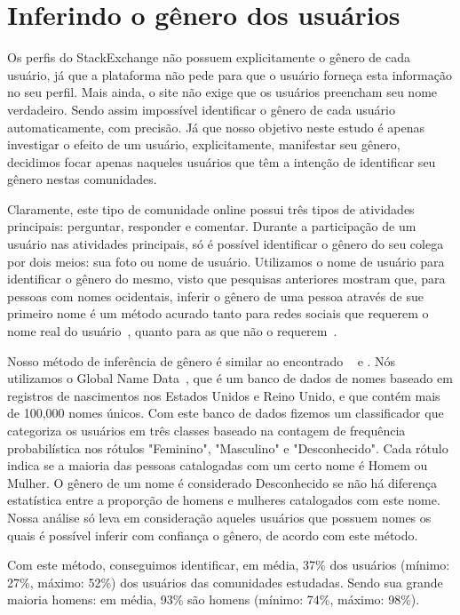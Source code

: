 \section{Inferindo o gênero dos usuários}

Os perfis do StackExchange não possuem explicitamente o gênero de cada usuário, já que a plataforma não pede para que o usuário forneça esta informação no seu perfil. Mais ainda, o site não exige que os usuários preencham seu nome verdadeiro. Sendo assim impossível identificar o gênero de cada usuário automaticamente, com precisão. Já que nosso objetivo neste estudo é apenas investigar o efeito de um usuário, explicitamente, manifestar seu gênero, decidimos focar apenas naqueles usuários que têm a intenção de identificar seu gênero nestas comunidades.

Claramente, este tipo de comunidade online possui três tipos de atividades principais: perguntar, responder e comentar. Durante a participação de um usuário nas atividades principais, só é possível identificar o gênero do seu colega por dois meios: sua foto ou nome de usuário. Utilizamos o nome de usuário para identificar o gênero do mesmo, visto que pesquisas anteriores mostram que, para pessoas com nomes ocidentais, inferir o gênero de uma pessoa através de sue primeiro nome é um método acurado tanto para redes sociais que requerem o nome real do usuário~\cite{tang2011s}, quanto para as que não o requerem~\cite{burger2011discriminating}\cite{liu2013s}.

Nosso método de inferência de gênero é similar ao encontrado ~\cite{liu2013s} e \cite{cunha2014he}. Nós utilizamos o Global Name Data~\cite{Hyland:2013:Online}, que é um banco de dados de nomes baseado em registros de nascimentos nos Estados Unidos e Reino Unido, e que contém mais de 100,000 nomes únicos. Com este banco de dados fizemos um classificador que categoriza os usuários em três classes baseado na contagem de frequência probabilística nos rótulos "Feminino", "Masculino" e "Desconhecido". Cada rótulo indica se a maioria das pessoas catalogadas com um certo nome é Homem ou Mulher. O gênero de um nome é considerado Desconhecido se não há diferença estatística entre a proporção de homens e mulheres catalogados com este nome. Nossa análise só leva em consideração aqueles usuários que possuem nomes os quais é possível inferir com confiança o gênero, de acordo com este método.

Com este método, conseguimos identificar, em média, 37\% dos usuários (mínimo: 27\%, máximo: 52\%) dos usuários das comunidades estudadas. Sendo sua grande maioria homens: em média, 93\% são homens (mínimo: 74\%, máximo: 98\%).

